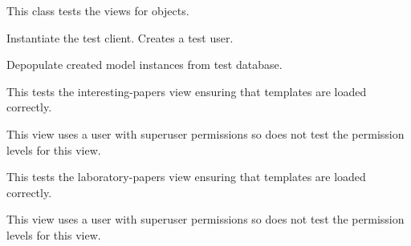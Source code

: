 \documentclass[letterpaper,10pt,english]{sphinxmanual}
\begin{document}

\begin{fulllineitems}
\label{papers:papers.tests.PublicationViewTests}
This class tests the views for {\hyperref[papers:papers.models.Publication]{}} objects.

\begin{fulllineitems}
\label{papers:papers.tests.PublicationViewTests.setUp}
Instantiate the test client.  Creates a test user.

\end{fulllineitems}


\begin{fulllineitems}
\label{papers:papers.tests.PublicationViewTests.tearDown}
Depopulate created model instances from test database.

\end{fulllineitems}


\begin{fulllineitems}
\label{papers:papers.tests.PublicationViewTests.test_interesting_papers_list}
This tests the interesting-papers view ensuring that templates are loaded correctly.

This view uses a user with superuser permissions so does not test the permission levels for this view.

\end{fulllineitems}


\begin{fulllineitems}
\label{papers:papers.tests.PublicationViewTests.test_lab_papers_list}
This tests the laboratory-papers view ensuring that templates are loaded correctly.

This view uses a user with superuser permissions so does not test the permission levels for this view.


\end{fulllineitems}
\end{fulllineitems}
\end{document}
